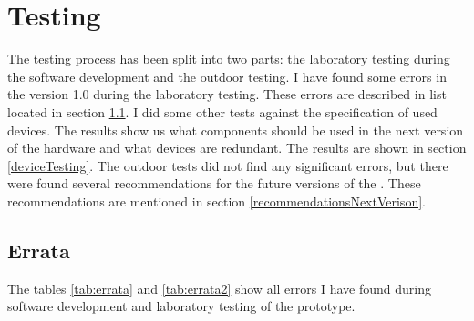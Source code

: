 \section{Testing}
\label{HWtesting}
The testing process has been split into two parts: the laboratory testing during the software development and the outdoor testing. I have found some errors in the version 1.0 during the laboratory testing. These errors are described in  list located in section \ref{errata}. I did some other tests against the specification of used devices. The results show us what components should be used in the next version of the hardware and what devices are redundant. The results are shown in section \ref{deviceTesting}. The outdoor tests did not find any significant errors, but there were found several recommendations for the future versions of the . These recommendations are mentioned in section \ref{recommendationsNextVerison}.

\subsection{Errata}
\label{errata}
The tables \ref{tab:errata} and \ref{tab:errata2} show all errors I have found during software development and laboratory testing of the  prototype.

